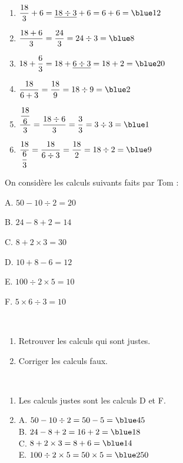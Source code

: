 \begin{colonne*exercice}
\begin{corrige}
   \ \\ [-5mm]
   \begin{enumerate}
      \item $\dfrac{18}{3}+6 =\underline{18\div3}+6 =6+6 =\blue 12$ \medskip
      \item $\dfrac{18+6}{3} =\dfrac{24}{3} =24\div3 =\blue 8$ \medskip
      \item $18+\dfrac{6}{3} =18+\underline{6\div3} =18+2 =\blue 20$ \medskip
      \item $\dfrac{18}{6+3} =\dfrac{18}{9} =18\div9 =\blue 2$ \medskip
      \item $\dfrac{\dfrac{18}{6}}{3} =\dfrac{18\div6}{3} =\dfrac{3}{3} =3\div3 =\blue 1$ \medskip
      \item $\dfrac{18}{\dfrac{6}{3}} =\dfrac{18}{6\div3} =\dfrac{18}{2} =18\div2 =\blue 9$
   \end{enumerate}
\end{corrige}

\bigskip


\begin{exercice} %
   On considère les calculs suivants faits par Tom :
   \begin{colitemize}{2}
      \item A. \;$50-10\div2 =20$
      \item B. \;$24-8+2 =14$
      \item C. \;$8+2\times3 =30$
      \item D. \;$10+8-6 =12$
      \item E. \;$100\div2\times5 =10$
      \item F. \;$5\times6\div3 =10$
   \end{colitemize}
   \  \\ [-10mm]
   \begin{enumerate}
      \item Retrouver les calculs qui sont justes.
      \item Corriger les calculs faux.
   \end{enumerate}
\end{exercice}

\begin{corrige}
   \ \\ [-5mm]
   \begin{enumerate}
      \item Les calculs justes sont les calculs {\blue D} et {\blue F}. \smallskip
      \item A. $50-10\div2 =50-5 ={\blue 45}$ \\ [1mm]
         B. $24-8+2 =16+2 ={\blue 18}$ \\ [1mm]
         C. $8+2\times3 =8+6 ={\blue 14}$ \\ [1mm]
         E. $100\div2\times5 =50\times5 = {\blue 250}$
   \end{enumerate}
\end{corrige}


\end{colonne*exercice}
